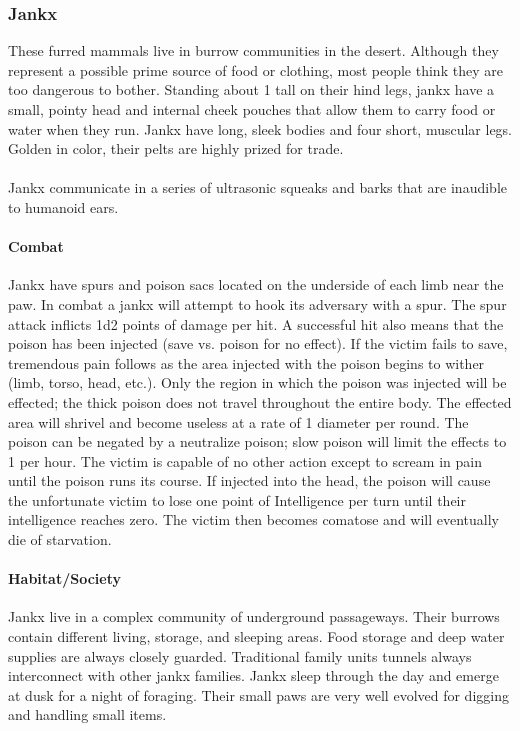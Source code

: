\subsubsection{Jankx}
These furred mammals live in burrow communities in the desert.
Although they represent a possible prime source of food or
clothing, most people think they are too dangerous to bother.
Standing about 1 tall on their hind legs, jankx have a small,
pointy head and internal cheek pouches that allow them to carry
food or water when they run. Jankx have long, sleek bodies
and four short, muscular legs. Golden in color, their pelts are
highly prized for trade.\\
\\
Jankx communicate in a series of ultrasonic squeaks and
barks that are inaudible to humanoid ears.

\paragraph{Combat}
Jankx have spurs and poison sacs located on the underside of
each limb near the paw. In combat a jankx will attempt
to hook its adversary with a spur. The spur attack inflicts 1d2
points of damage per hit. A successful hit also means that the
poison has been injected (save vs. poison for no effect). If the
victim fails to save, tremendous pain follows as the area injected
with the poison begins to wither (limb, torso, head, etc.). Only
the region in which the poison was injected will be effected; the
thick poison does not travel throughout the entire body. The
effected area will shrivel and become useless at a rate of 1 diameter
per round. The poison can be negated by a neutralize poison;
slow poison will limit the effects to 1 per hour. The victim is
capable of no other action except to scream in pain until the poison
runs its course. If injected into the head, the poison will
cause the unfortunate victim to lose one point of Intelligence per
turn until their intelligence reaches zero. The victim then becomes
comatose and will eventually die of starvation.

\paragraph{Habitat/Society}
Jankx live in a complex community of underground passageways.
Their burrows contain different living, storage, and sleeping
areas. Food storage and deep water supplies are always closely
guarded. Traditional family units tunnels always interconnect
with other jankx families. Jankx sleep through the day and emerge
at dusk for a night of foraging. Their small paws are very well
evolved for digging and handling small items.

